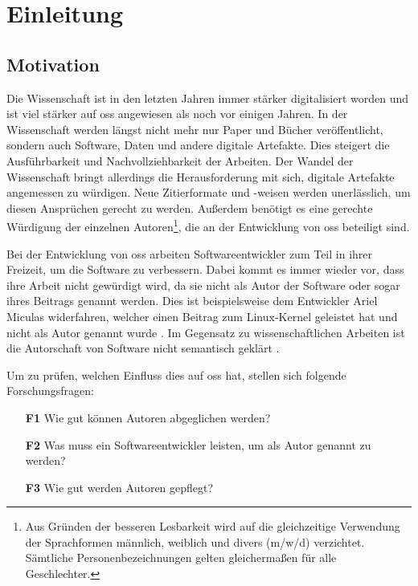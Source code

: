 \chapter{Einleitung}
\label{chap:einleitung}
\section{Motivation}
\label{sec:motivation}
Die Wissenschaft ist in den letzten Jahren immer stärker digitalisiert worden und ist viel stärker auf \gls{oss} angewiesen als noch vor einigen Jahren.
In der Wissenschaft werden längst nicht mehr nur Paper und Bücher veröffentlicht, sondern auch Software, Daten und andere digitale Artefakte.
Dies steigert die Ausführbarkeit und Nachvollziehbarkeit der Arbeiten.
Der Wandel der Wissenschaft bringt allerdings die Herausforderung mit sich, digitale Artefakte angemessen zu würdigen.
Neue Zitierformate und -weisen werden unerlässlich, um diesen Ansprüchen gerecht zu werden.
Außerdem benötigt es eine gerechte Würdigung der einzelnen Autoren\footnote{Aus Gründen der besseren Lesbarkeit wird auf die gleichzeitige Verwendung der Sprachformen männlich, weiblich und divers (m/w/d) verzichtet. Sämtliche Personenbezeichnungen gelten gleichermaßen für alle Geschlechter.}, die an der Entwicklung von \gls{oss} beteiligt sind.

Bei der Entwicklung von \gls{oss} arbeiten Softwareentwickler zum Teil in ihrer Freizeit, um die Software zu verbessern.
Dabei kommt es immer wieder vor, dass ihre Arbeit nicht gewürdigt wird, da sie nicht als Autor der Software oder sogar ihres Beitrags genannt werden.
Dies ist beispielsweise dem Entwickler Ariel Miculas widerfahren, welcher einen Beitrag zum Linux-Kernel geleistet hat und nicht als Autor genannt wurde \autocite{miculas_how_2023}.
Im Gegensatz zu wissenschaftlichen Arbeiten ist die Autorschaft von Software nicht semantisch geklärt \autocite{schmidt_software_nodate}.

Um zu prüfen, welchen Einfluss dies auf \gls{oss} hat, stellen sich folgende Forschungsfragen:

\begin{itemize}
    \item[\textbf{F1}] Wie gut können Autoren abgeglichen werden?
    \item[\textbf{F2}] Was muss ein Softwareentwickler leisten, um als Autor genannt zu werden?
    \item[\textbf{F3}] Wie gut werden Autoren gepflegt?
\end{itemize}

